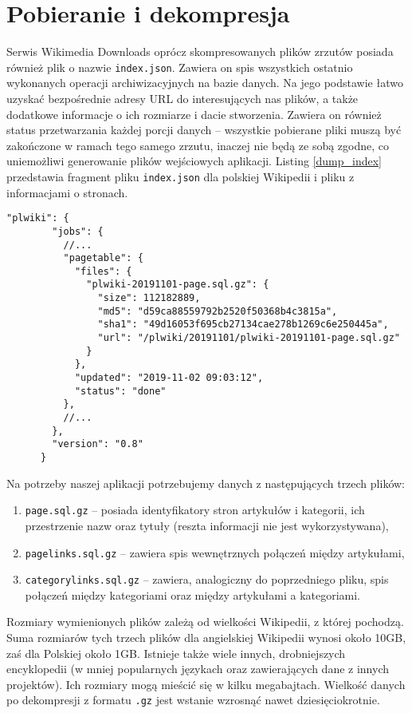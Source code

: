 \section{Pobieranie i dekompresja}
Serwis Wikimedia Downloads oprócz skompresowanych plików zrzutów posiada również plik o nazwie \lstinline!index.json!. Zawiera on spis wszystkich ostatnio wykonanych operacji archiwizacyjnych na bazie danych. Na jego podstawie łatwo uzyskać bezpośrednie adresy URL do interesujących nas plików, a także dodatkowe informacje o ich rozmiarze i dacie stworzenia. Zawiera on również status przetwarzania każdej porcji danych – wszystkie pobierane pliki muszą być zakończone w ramach tego samego zrzutu, inaczej nie będą ze sobą zgodne, co uniemożliwi generowanie plików wejściowych aplikacji. Listing \ref{dump_index} przedstawia fragment pliku \lstinline!index.json! dla polskiej Wikipedii i pliku z informacjami o stronach.

\begin{lstlisting}[frame=single,caption={Fragment informacji o ostatnim zrzucie bazy danych polskiej Wikipedii},label=dump_index]
    "plwiki": {
        "jobs": {
          //...
          "pagetable": {
            "files": {
              "plwiki-20191101-page.sql.gz": {
                "size": 112182889,
                "md5": "d59ca88559792b2520f50368b4c3815a",
                "sha1": "49d16053f695cb27134cae278b1269c6e250445a",
                "url": "/plwiki/20191101/plwiki-20191101-page.sql.gz"
              }
            },
            "updated": "2019-11-02 09:03:12",
            "status": "done"
          },
          //...
        },
        "version": "0.8"
      }      
\end{lstlisting}

Na potrzeby naszej aplikacji potrzebujemy danych z następujących trzech plików:

\begin{enumerate}[label=\textbullet]
    \item \lstinline!page.sql.gz! – posiada identyfikatory stron artykułów i kategorii, ich przestrzenie nazw oraz tytuły (reszta informacji nie jest wykorzystywana),
    \item \lstinline!pagelinks.sql.gz! – zawiera spis wewnętrznych połączeń między artykułami,
    \item \lstinline!categorylinks.sql.gz! – zawiera, analogiczny do poprzedniego pliku, spis połączeń między kategoriami oraz między artykułami a kategoriami.
\end{enumerate}

Rozmiary wymienionych plików zależą od wielkości Wikipedii, z której pochodzą. Suma rozmiarów tych trzech plików dla angielskiej Wikipedii wynosi około 10GB, zaś dla Polskiej około 1GB. Istnieje także wiele innych, drobniejszych encyklopedii (w mniej popularnych językach oraz zawierających dane z innych projektów). Ich rozmiary mogą mieścić się w kilku megabajtach. Wielkość danych po dekompresji z formatu \lstinline!.gz! jest wstanie wzrosnąć nawet dziesięciokrotnie.